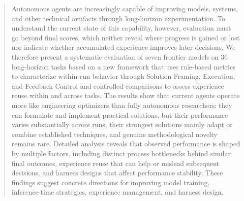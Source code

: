 \begin{abstract}

Autonomous agents are increasingly capable of improving models, systems, and other technical artifacts through long-horizon experimentation.
To understand the current state of this capability, however, evaluation must go beyond final scores, which neither reveal where progress is gained or lost nor indicate whether accumulated experience improves later decisions.
We therefore present a systematic evaluation of seven frontier models on 36 long-horizon tasks based on a new framework that uses rule-based metrics to characterize within-run behavior through Solution Framing, Execution, and Feedback Control and controlled comparisons to assess experience reuse within and across tasks.
The results show that current agents operate more like engineering optimizers than fully autonomous researchers: they can formulate and implement practical solutions, but their performance varies substantially across runs, their strongest solutions mainly adapt or combine established techniques, and genuine methodological novelty remains rare.
Detailed analysis reveals that observed performance is shaped by multiple factors, including distinct process bottlenecks behind similar final outcomes, experience reuse that can help or mislead subsequent decisions, and harness designs that affect performance stability.
These findings suggest concrete directions for improving model training, inference-time strategies, experience management, and harness design.








\end{abstract}
